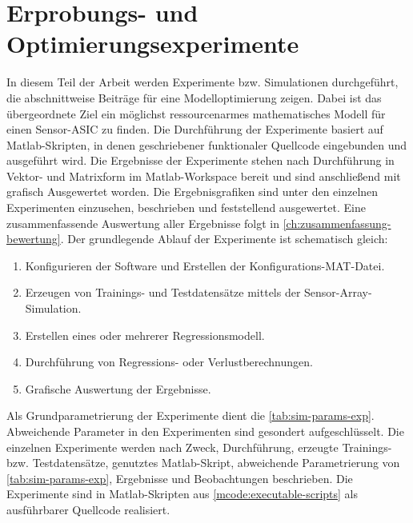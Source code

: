 %

\chapter{Erprobungs- und Optimierungsexperimente}\label{ch:erprobungs-u-opt-exp}


In diesem Teil der Arbeit werden Experimente bzw. Simulationen durchgeführt, die abschnittweise Beiträge für eine Modelloptimierung zeigen. Dabei ist das übergeordnete Ziel ein möglichst ressourcenarmes mathematisches Modell für einen Sensor-ASIC zu finden. Die Durchführung der Experimente basiert auf Matlab-Skripten, in denen geschriebener funktionaler Quellcode eingebunden und ausgeführt wird. Die Ergebnisse der Experimente stehen nach Durchführung in Vektor- und Matrixform im Matlab-Workspace bereit und sind anschließend mit grafisch Ausgewertet worden. Die Ergebnisgrafiken sind unter den einzelnen Experimenten einzusehen, beschrieben und feststellend ausgewertet. Eine zusammenfassende Auswertung aller Ergebnisse folgt in \autoref{ch:zusammenfassung-bewertung}. Der grundlegende Ablauf der Experimente ist schematisch gleich:


\begin{enumerate}
	\item Konfigurieren der Software und Erstellen der Konfigurations-MAT-Datei.
	\item Erzeugen von Trainings- und Testdatensätze mittels der Sensor-Array-Simulation.
	\item Erstellen eines oder mehrerer Regressionsmodell.
	\item Durchführung von Regressions- oder Verlustberechnungen.
	\item Grafische Auswertung der Ergebnisse.
\end{enumerate}


Als Grundparametrierung der Experimente dient die \autoref{tab:sim-params-exp}. Abweichende Parameter in den Experimenten sind gesondert aufgeschlüsselt. Die einzelnen Experimente werden nach Zweck, Durchführung, erzeugte Trainings- bzw. Testdatensätze, genutztes Matlab-Skript, abweichende Parametrierung von \autoref{tab:sim-params-exp}, Ergebnisse und Beobachtungen beschrieben. Die Experimente sind in Matlab-Skripten aus \autoref{mcode:executable-scripts} als ausführbarer Quellcode realisiert.


\clearpage


